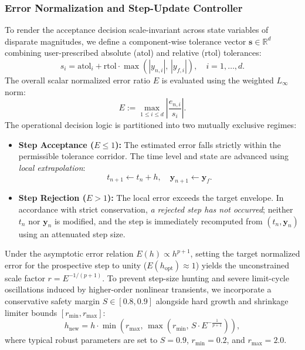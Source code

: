 \documentclass[11pt,a4paper]{article}
\theoremstyle{definition}
\theoremstyle{remark}
\begin{document}
\subsubsection{Error Normalization and Step-Update Controller}
To render the acceptance decision scale-invariant across state variables of disparate magnitudes, we define a component-wise tolerance vector $\mathbf{s} \in \mathbb{R}^d$ combining user-prescribed absolute ($\text{atol}$) and relative ($\text{rtol}$) tolerances:
\begin{equation}
\label{eq:scale_vector}
s_i = \text{atol}_i + \text{rtol} \cdot \max\left(|y_{n, i}|, \, |y_{f, i}|\right), \quad i = 1, \dots, d.
\end{equation}
The overall scalar normalized error ratio $E$ is evaluated using the weighted $L_\infty$ norm:
\begin{equation}
\label{eq:normalized_error_ratio}
E := \max_{1 \le i \le d} \left| \frac{\hat{e}_{n, i}}{s_i} \right|.
\end{equation}
The operational decision logic is partitioned into two mutually exclusive regimes:
\begin{itemize}
    \item \textbf{Step Acceptance ($E \le 1$):} The estimated error falls strictly within the permissible tolerance corridor. The time level and state are advanced using \emph{local extrapolation}:
    \begin{equation}
    \label{eq:local_extrapolation}
    t_{n+1} \gets t_n + h, \quad \mathbf{y}_{n+1} \gets \mathbf{y}_f.
    \end{equation}
    \item \textbf{Step Rejection ($E > 1$):} The local error exceeds the target envelope. In accordance with strict conservation, \emph{a rejected step has not occurred}; neither $t_n$ nor $\mathbf{y}_n$ is modified, and the step is immediately recomputed from $(t_n, \mathbf{y}_n)$ using an attenuated step size.
\end{itemize}

Under the asymptotic error relation $E(h) \propto h^{p+1}$, setting the target normalized error for the prospective step to unity ($E(h_{\text{opt}}) \approx 1$) yields the unconstrained scale factor $r = E^{-1/(p+1)}$. To prevent step-size hunting and severe limit-cycle oscillations induced by higher-order nonlinear transients, we incorporate a conservative safety margin $S \in [0.8, 0.9]$ alongside hard growth and shrinkage limiter bounds $[r_{\min}, r_{\max}]$:
\begin{equation}
\label{eq:step_update_formula}
h_{\text{new}} = h \cdot \min\left(r_{\max}, \, \max\left(r_{\min}, \, S \cdot E^{-\frac{1}{p+1}}\right)\right),
\end{equation}
where typical robust parameters are set to $S = 0.9$, $r_{\min} = 0.2$, and $r_{\max} = 2.0$.
\end{document}
